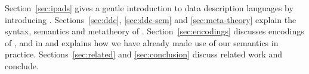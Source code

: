 Section~\ref{sec:ipads} gives a gentle introduction to data description
languages by introducing \ipads.  Sections~\ref{sec:ddc}, \ref{sec:ddc-sem} and \ref{sec:meta-theory}
explain the syntax, semantics and metatheory of \ddc{}.
Section~\ref{sec:encodings} discusses encodings of \ipads{}, \packettypes{}
and \datascript{} in \ddc{} and 
explains how we have already made use of our semantics in practice.  
Sections~\ref{sec:related} and 
\ref{sec:conclusion} discuss related work and conclude.

